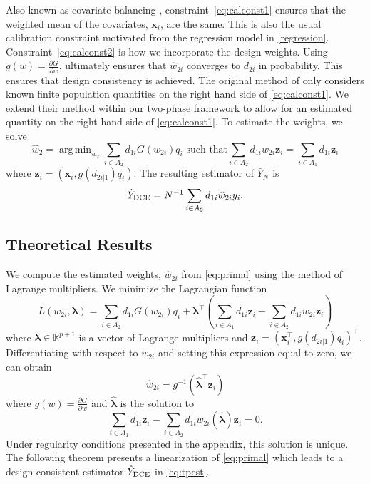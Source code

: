 \documentclass[12pt]{article}
\DeclareMathOperator*{\argmin}{arg\,min}
\newcommand{\R}{\mathbb{R}}
\renewcommand{\bf}[1]{\mathbf{#1}}
\begin{document}
Also known as covariate balancing \citep{imai2014covariate},
constraint~\eqref{eq:calconst1} ensures that the weighted mean of the
covariates, $\bf{x}_i$, are the same.
This is also the usual calibration constraint motivated from
the regression model in \eqref{regression}.
Constraint~\eqref{eq:calconst2} is how we incorporate the design weights. Using
$g(w) = \frac{\partial G}{\partial w}$, ultimately ensures that $\hat w_{2i}$
converges to $d_{2i}$ in probability. This 
ensures that design consistency is achieved. 
The original method of \cite{kwon2024debiased} only considers known finite
population quantities on the right hand side of \eqref{eq:calconst1}. We extend
their method within our two-phase framework to allow for an estimated quantity
on the right hand side of \eqref{eq:calconst1}.
To estimate the weights, we solve
\begin{equation}\label{eq:primal}
  \hat w_2  = \argmin_{w_{2}} \sum_{i \in A_2} d_{1i} G(w_{2i}) q_i 
  \text{ such that}
  \sum_{i \in A_2} d_{1i} w_{2i} \bf z_i = \sum_{i \in A_1} d_{1i} \bf z_i 
\end{equation}
where  $\bf z_i = (\bf x_i , g(d_{2i|1})q_i)$. The resulting 
estimator of $\bar Y_N$ is 
\begin{equation}\label{eq:tpest}
  \hat Y_{\rm DCE} = N^{-1} \sum_{i \in A_2} d_{1i} \hat w_{2i} y_i.
\end{equation}

\subsection{Theoretical Results}

We compute the estimated weights, $\hat w_{2i}$ from
\eqref{eq:primal} using the method of Lagrange multipliers. We 
minimize the Lagrangian function 
\begin{equation}\label{eq:legragedc1}
  L(w_{2i}, \bm \lambda) = \sum_{i \in A_2} d_{1i} G(w_{2i}) q_i 
  + \bm \lambda^\top \left( \sum_{i \in A_1} d_{1i} \bf z_i -
    \sum_{i \in A_2} d_{1i} w_{2i} \bf z_i\right)
\end{equation}
where $\bm \lambda \in \R^{p+1}$ is a vector of Lagrange multipliers and
$\bf{z}_i = (\bf{x}_i^\top, g(d_{2i|1})q_i)^\top$.
Differentiating with respect to $w_{2i}$ and setting this expression equal to
zero, we can obtain 
$$ \hat w_{2i} = g^{-1}(\hat{\bm \lambda}^\top \bf z_i) $$
where $g(w) = \frac{\partial G}{\partial w}$ and 
$\hat{\bm \lambda}$ is the solution to
\begin{equation}\label{eq:lamdc1}
  \sum_{i \in A_1} d_{1i} \bf{z}_i  -
  \sum_{i \in A_2} d_{1i} w_{2i}(\hat{\bm \lambda}) \bf{z}_i = 0.
\end{equation}
Under regularity conditions presented in the appendix, this solution is unique.
The following theorem presents a linearization of
\eqref{eq:primal} which leads to a design consistent estimator 
$\hat Y_{\rm DCE}$ in \eqref{eq:tpest}.
\end{document}
